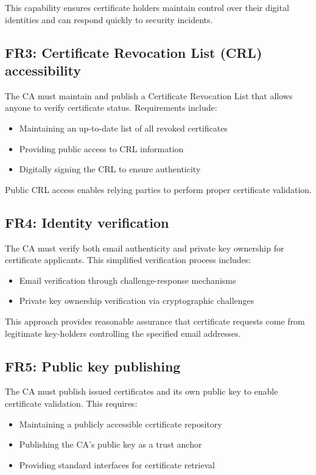 This capability ensures certificate holders maintain control over their 
digital identities and can respond quickly to security incidents.

\subsection{FR3: Certificate Revocation List (CRL) accessibility}

The CA must maintain and publish a Certificate Revocation List that allows 
anyone to verify certificate status. Requirements include:

\begin{itemize}
    \item Maintaining an up-to-date list of all revoked certificates
    \item Providing public access to CRL information
    \item Digitally signing the CRL to ensure authenticity
\end{itemize}

Public CRL access enables relying parties to perform proper certificate validation.

\subsection{FR4: Identity verification}

The CA must verify both email authenticity and private key ownership for 
certificate applicants. This simplified verification process includes:

\begin{itemize}
    \item Email verification through challenge-response mechanisms
    \item Private key ownership verification via cryptographic challenges
\end{itemize}

This approach provides reasonable assurance that certificate requests come 
from legitimate key-holders controlling the specified email addresses.

\subsection{FR5: Public key publishing}

The CA must publish issued certificates and its own public key to enable 
certificate validation. This requires:

\begin{itemize}
    \item Maintaining a publicly accessible certificate repository
    \item Publishing the CA's public key as a trust anchor
    \item Providing standard interfaces for certificate retrieval
\end{itemize}

